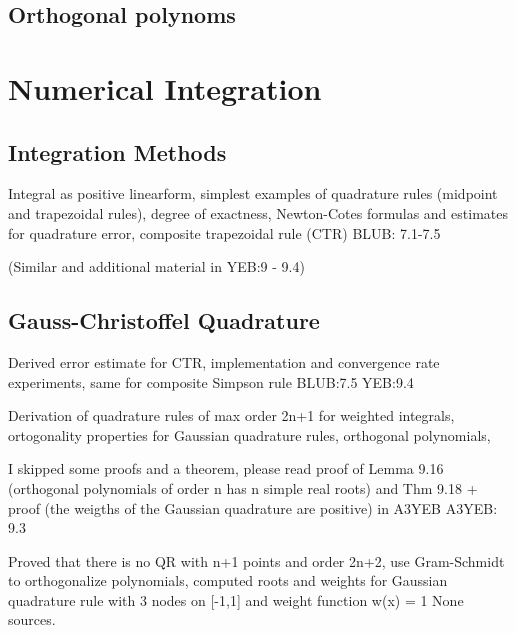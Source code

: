 \documentclass{article}
\theoremstyle{remark}
\begin{document}
\subsection{Orthogonal polynoms}%
\label{sub:orthogonal_polynoms}

\newpage
\section{Numerical Integration}%
\label{sec:numerical_integration}

\subsection{Integration Methods}%
\label{sub:trapezoid_rule}
\begin{tcolorbox}
  Integral as positive linearform, simplest examples of  quadrature rules (midpoint and trapezoidal rules), degree of exactness, Newton-Cotes formulas and estimates for quadrature error, composite trapezoidal rule (CTR)
  BLUB: 7.1-7.5

  (Similar and additional material in YEB:9 - 9.4)
\end{tcolorbox}

\subsection{Gauss-Christoffel Quadrature}%
\label{sub:gauss_christoffel_quadrature}
\begin{tcolorbox}
  Derived error estimate for CTR, implementation and convergence rate experiments, same for composite Simpson rule	
  BLUB:7.5
YEB:9.4
\end{tcolorbox}


\begin{tcolorbox}
  Derivation of quadrature rules of max order 2n+1 for weighted integrals, ortogonality properties for Gaussian quadrature rules, orthogonal polynomials,

I skipped some proofs and a theorem, please read proof of Lemma 9.16 (orthogonal polynomials of order n has n simple real roots)  and Thm 9.18 + proof (the weigths of the Gaussian quadrature are positive) in A3YEB
A3YEB: 9.3

\end{tcolorbox}

\begin{tcolorbox}
  Proved that there is no QR with n+1 points and order 2n+2, use Gram-Schmidt to orthogonalize polynomials, computed roots and weights for Gaussian quadrature rule with 3 nodes on [-1,1] and weight function w(x) = 1
None sources.

\end{tcolorbox}
\end{document}
